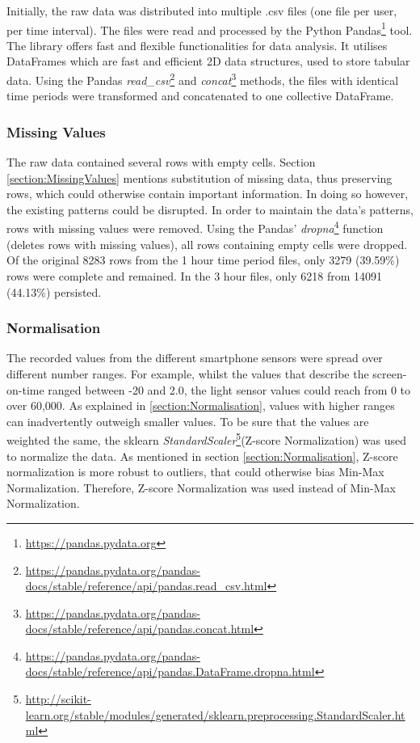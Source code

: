 Initially, the raw data was distributed into multiple .csv files (one file per user, per time interval). The files were read and processed by the Python Pandas\footnote{\url{https://pandas.pydata.org}} tool. The library offers fast and flexible functionalities for data analysis. It utilises DataFrames which are fast and efficient 2D data structures, used to store tabular data. Using the Pandas \textit{read\_csv}\footnote{\url{https://pandas.pydata.org/pandas-docs/stable/reference/api/pandas.read_csv.html}} and \textit{concat}\footnote{\url{https://pandas.pydata.org/pandas-docs/stable/reference/api/pandas.concat.html}} methods, the files with identical time periods were transformed and concatenated to one collective DataFrame. 


\subsubsection{Missing Values}
The raw data contained several rows with empty cells. Section \ref{section:MissingValues} mentions substitution of missing data, thus preserving rows, which could otherwise contain important information. In doing so however, the existing patterns could be disrupted. In order to maintain the data's patterns, rows with missing values were removed. Using the Pandas' \textit{dropna}\footnote{\url{https://pandas.pydata.org/pandas-docs/stable/reference/api/pandas.DataFrame.dropna.html}} function (deletes rows with missing values), all rows containing empty cells were dropped. Of the original 8283 rows from the 1 hour time period files, only 3279 (39.59\%) rows were complete and remained. In the 3 hour files, only 6218 from 14091 (44.13\%) persisted.

\subsubsection{Normalisation}
The recorded values from the different smartphone sensors were spread over different number ranges. For example, whilst the values that describe the screen-on-time ranged between -20 and 2.0, the light sensor values could reach from 0 to over 60,000. As explained in \ref{section:Normalisation}, values with higher ranges can inadvertently outweigh smaller values. To be sure that the values are weighted the same, the sklearn \textit{StandardScaler}\footnote{\url{http://scikit-learn.org/stable/modules/generated/sklearn.preprocessing.StandardScaler.html}}(Z-score Normalization) was used to normalize the data. As mentioned in section \ref{section:Normalisation}, Z-score normalization is more robust to outliers, that could otherwise bias Min-Max Normalization. Therefore, Z-score Normalization was used instead of Min-Max Normalization.



